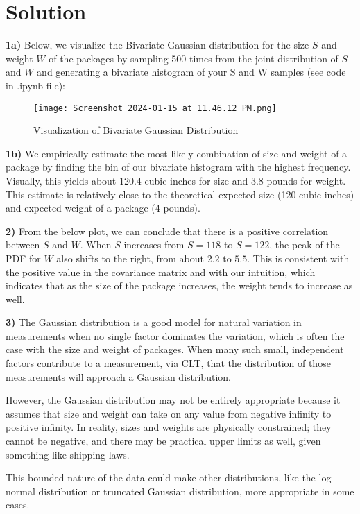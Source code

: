 \documentclass{harvardml}
\theoremstyle{definition}
\theoremstyle{plain}
\newenvironment{solution}
  {\color{blue}\section*{Solution}}
{}
\begin{document}
\begin{solution}
	\textbf{1a) }  Below, we visualize the Bivariate Gaussian distribution for the size $S$ and weight $W$ of the packages
by sampling 500 times from the joint distribution of $S$ and $W$ and generating a bivariate histogram of your S and W samples (see code in .ipynb file):

\begin{figure}[H]
    \centering
    \texttt{[image: Screenshot 2024-01-15 at 11.46.12 PM.png]}
    \caption{Visualization of Bivariate Gaussian Distribution}
    \label{fig:enter-label}
\end{figure}


\textbf{1b) } We empirically estimate the most likely combination of size and weight of a package by finding the bin of our bivariate histogram with the highest frequency. Visually, this yields about 120.4 cubic inches for size and 3.8 pounds for weight. This estimate is relatively close to the theoretical expected size (120 cubic inches) and expected weight of a package (4 pounds). 


\textbf{2) }
From the below plot, we can conclude that there is a positive correlation between 
$S$ and $W$. When $S$ increases from $S = 118$ to $S = 122$, the peak of the PDF for 
$W$ also shifts to the right, from about $2.2$ to $5.5$. This is consistent with the positive value in the covariance matrix and with our intuition, which indicates that as the size of the package increases, the weight tends to increase as well. 

\textbf{3) } The Gaussian distribution is a good model for natural variation in measurements when no single factor dominates the variation, which is often the case with the size and weight of packages. When many such small, independent factors contribute to a measurement, via CLT, that the distribution of those measurements will approach a Gaussian distribution.

 However, the Gaussian distribution may not be entirely appropriate because it assumes that size and weight can take on any value from negative infinity to positive infinity. In reality, sizes and weights are physically constrained; they cannot be negative, and there may be practical upper limits as well, given something like shipping laws. 

 This bounded nature of the data could make other distributions, like the log-normal distribution or truncated Gaussian distribution, more appropriate in some cases.


\end{solution}
\end{document}
